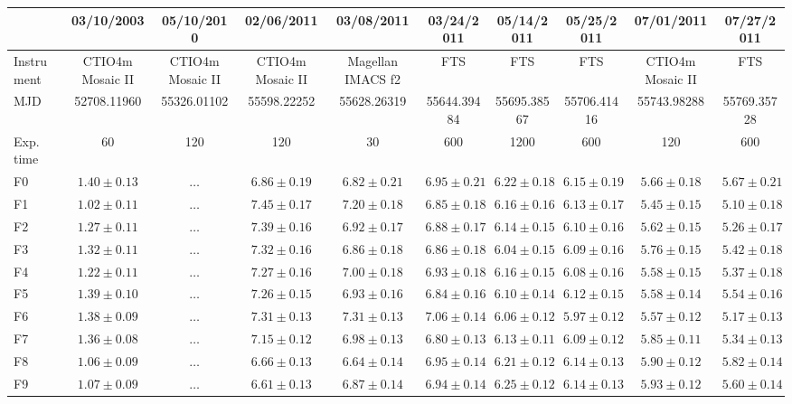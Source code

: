 \begin{table}
\scriptsize
\begin{center}
\begin{tabular}{lccccccccc}
\hline
& 03/10/2003 & 05/10/2010 & 02/06/2011 & 03/08/2011 & 03/24/2011 & 05/14/2011 & 05/25/2011 & 07/01/2011 & 07/27/2011\\
\hline
\hline
Instrument & CTIO4m Mosaic II & CTIO4m Mosaic II & CTIO4m Mosaic II & Magellan IMACS f2 & FTS & FTS & FTS & CTIO4m Mosaic II & FTS\\
MJD & 52708.11960 & 55326.01102 & 55598.22252 & 55628.26319 & 55644.39484 & 55695.38567 & 55706.41416 & 55743.98288 & 55769.35728\\
Exp. time & 60 & 120 & 120 & 30 & 600 & 1200 & 600 & 120 & 600\\
F0 & $1.40\pm0.13$ & $\dots$ & $6.86\pm0.19$ & $6.82\pm0.21$ & $6.95\pm0.21$ & $6.22\pm0.18$ & $6.15\pm0.19$ & $5.66\pm0.18$ & $5.67\pm0.21$\\
F1 & $1.02\pm0.11$ & $\dots$ & $7.45\pm0.17$ & $7.20\pm0.18$ & $6.85\pm0.18$ & $6.16\pm0.16$ & $6.13\pm0.17$ & $5.45\pm0.15$ & $5.10\pm0.18$\\
F2 & $1.27\pm0.11$ & $\dots$ & $7.39\pm0.16$ & $6.92\pm0.17$ & $6.88\pm0.17$ & $6.14\pm0.15$ & $6.10\pm0.16$ & $5.62\pm0.15$ & $5.26\pm0.17$\\
F3 & $1.32\pm0.11$ & $\dots$ & $7.32\pm0.16$ & $6.86\pm0.18$ & $6.86\pm0.18$ & $6.04\pm0.15$ & $6.09\pm0.16$ & $5.76\pm0.15$ & $5.42\pm0.18$\\
F4 & $1.22\pm0.11$ & $\dots$ & $7.27\pm0.16$ & $7.00\pm0.18$ & $6.93\pm0.18$ & $6.16\pm0.15$ & $6.08\pm0.16$ & $5.58\pm0.15$ & $5.37\pm0.18$\\
F5 & $1.39\pm0.10$ & $\dots$ & $7.26\pm0.15$ & $6.93\pm0.16$ & $6.84\pm0.16$ & $6.10\pm0.14$ & $6.12\pm0.15$ & $5.58\pm0.14$ & $5.54\pm0.16$\\
F6 & $1.38\pm0.09$ & $\dots$ & $7.31\pm0.13$ & $7.31\pm0.13$ & $7.06\pm0.14$ & $6.06\pm0.12$ & $5.97\pm0.12$ & $5.57\pm0.12$ & $5.17\pm0.13$\\
F7 & $1.36\pm0.08$ & $\dots$ & $7.15\pm0.12$ & $6.98\pm0.13$ & $6.80\pm0.13$ & $6.13\pm0.11$ & $6.09\pm0.12$ & $5.85\pm0.11$ & $5.34\pm0.13$\\
F8 & $1.06\pm0.09$ & $\dots$ & $6.66\pm0.13$ & $6.64\pm0.14$ & $6.95\pm0.14$ & $6.21\pm0.12$ & $6.14\pm0.13$ & $5.90\pm0.12$ & $5.82\pm0.14$\\
F9 & $1.07\pm0.09$ & $\dots$ & $6.61\pm0.13$ & $6.87\pm0.14$ & $6.94\pm0.14$ & $6.25\pm0.12$ & $6.14\pm0.13$ & $5.93\pm0.12$ & $5.60\pm0.14$\\

\end{tabular}
\end{center}
\end{table}
